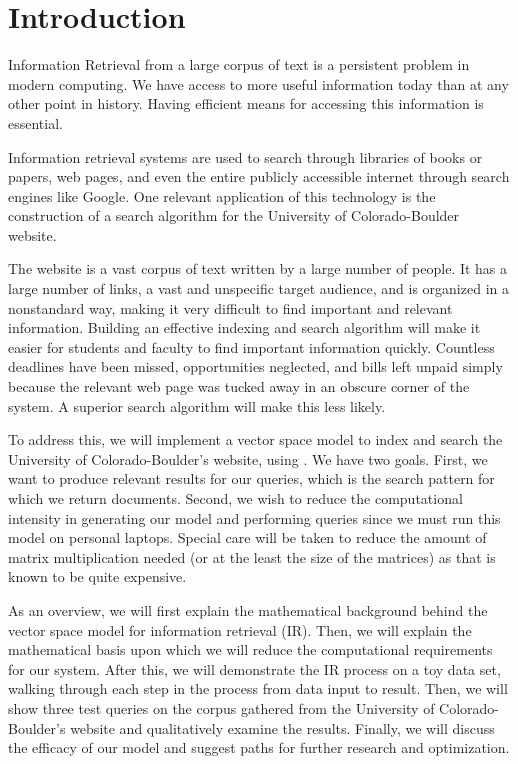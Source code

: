 \section{Introduction} \label{sec:intro}

Information Retrieval from a large corpus of text is a persistent problem in modern computing. We have access to more useful information
today than at any other point in history. Having efficient means for accessing this information is essential.

Information retrieval systems are used to search through libraries of books or papers, web pages, and even the entire publicly accessible internet through search engines like Google. One relevant application of this technology is the construction of a search algorithm for the University of Colorado-Boulder website.

The website is a vast corpus of text written by a large number of people. It has a large number of links, a vast and unspecific target audience, and is organized in a nonstandard way, making it very difficult to find important and relevant information. Building an effective indexing and search algorithm will make it easier for students and faculty to find important information quickly. Countless deadlines have been missed, opportunities neglected, and bills left unpaid simply because the relevant web page was tucked away in an obscure corner of the system. A superior search algorithm will make this less likely.

To address this, we will implement a vector space model to index and search the University of Colorado-Boulder's website, using \cite{berry99}. We have two goals. First, we want to produce relevant results for our queries, which is the search pattern for which we return documents. Second, we wish to reduce the computational intensity in generating our model and performing queries since we must run this model on personal laptops. Special care will be taken to reduce the amount of matrix multiplication needed (or at the least the size of the matrices) as that is known to be quite expensive. 

As an overview, we will first explain the mathematical background behind the vector space model for information retrieval (IR). Then, we will explain the mathematical basis upon which we will reduce the computational requirements for our system. After this, we will demonstrate the IR process on a toy data set, walking through each step in the process from data input to result. Then, we will show three test queries on the corpus gathered from the University of Colorado-Boulder's website and qualitatively examine the results. Finally, we will discuss the efficacy of our model and suggest paths for further research and optimization.



